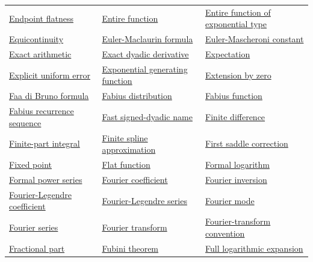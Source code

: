 \documentclass[11pt,oneside]{article}
\begin{document}
\begin{longtable}{p{}p{}p{}}
\hyperlink{gls:endpoint-flatness}{Endpoint flatness} & \hyperlink{gls:entire-function}{Entire function} & \hyperlink{gls:entire-function-exponential-type}{Entire function of exponential type} \\
\hyperlink{gls:equicontinuity}{Equicontinuity} & \hyperlink{gls:euler-maclaurin-formula}{Euler-Maclaurin formula} & \hyperlink{gls:euler-mascheroni-constant}{Euler-Mascheroni constant} \\
\hyperlink{gls:exact-arithmetic}{Exact arithmetic} & \hyperlink{gls:exact-dyadic-derivative}{Exact dyadic derivative} & \hyperlink{gls:expectation}{Expectation} \\
\hyperlink{gls:explicit-uniform-error}{Explicit uniform error} & \hyperlink{gls:exponential-generating-function}{Exponential generating function} & \hyperlink{gls:extension-by-zero}{Extension by zero} \\
\hyperlink{gls:faa-di-bruno-formula}{Faa di Bruno formula} & \hyperlink{gls:fabius-distribution}{Fabius distribution} & \hyperlink{gls:fabius-function}{Fabius function} \\
\hyperlink{gls:fabius-recurrence-sequence}{Fabius recurrence sequence} & \hyperlink{gls:fast-signed-dyadic-name}{Fast signed-dyadic name} & \hyperlink{gls:finite-difference}{Finite difference} \\
\hyperlink{gls:finite-part-integral}{Finite-part integral} & \hyperlink{gls:finite-spline-approximation}{Finite spline approximation} & \hyperlink{gls:first-saddle-correction}{First saddle correction} \\
\hyperlink{gls:fixed-point}{Fixed point} & \hyperlink{gls:flat-function}{Flat function} & \hyperlink{gls:formal-logarithm}{Formal logarithm} \\
\hyperlink{gls:formal-power-series}{Formal power series} & \hyperlink{gls:fourier-coefficient}{Fourier coefficient} & \hyperlink{gls:fourier-inversion}{Fourier inversion} \\
\hyperlink{gls:fourier-legendre-coefficient}{Fourier-Legendre coefficient} & \hyperlink{gls:fourier-legendre-series}{Fourier-Legendre series} & \hyperlink{gls:fourier-mode}{Fourier mode} \\
\hyperlink{gls:fourier-series}{Fourier series} & \hyperlink{gls:fourier-transform}{Fourier transform} & \hyperlink{gls:fourier-convention}{Fourier-transform convention} \\
\hyperlink{gls:fractional-part}{Fractional part} & \hyperlink{gls:fubini-theorem}{Fubini theorem} & \hyperlink{gls:full-logarithmic-expansion}{Full logarithmic expansion} \\

\end{longtable}
\end{document}
